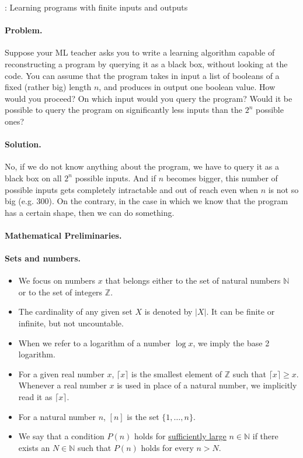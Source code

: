 \documentclass{article}
\begin{document}
			\begin{example}{: Learning programs with finite inputs and outputs}
				{\small
				\paragraph{\small Problem.}
				Suppose your ML teacher asks you to write a learning algorithm capable of reconstructing a program by querying it as a black box, without looking at the code. You can assume that the program takes in input a list of booleans of a fixed (rather big) length $n$, and produces in output one boolean value. How would you proceed? On which input would you query the program? Would it be possible to query the program on significantly less inputs than the $2^n$ possible ones?\\
				\paragraph{\small Solution.}
				No, if we do not know anything about the program, we have to query it as a black box on all $2^n$ possible inputs. And if $n$ becomes bigger, this number of possible inputs gets completely intractable and out of reach even when $n$ is not so big (e.g. 300). On the contrary, in the case in which we know that the program has a certain shape, then we can do something.
				}
			\end{example}
			\paragraph{\large Mathematical Preliminaries.}
			\paragraph{Sets and numbers.}
			\begin{itemize}
   				\item We focus on numbers $x$ that belongs either to the set of natural numbers $\mathbb{N}$ or to the set of integers $\mathbb{Z}$.
    			\item The cardinality of any given set $X$ is denoted by $\left\lvert X\right\rvert$. It can be finite or infinite, but not uncountable.
    			\item When we refer to a logarithm of a number $\log x$, we imply the base 2 logarithm.
    			\item For a given real number $x$, $\lceil x \rceil$ is the smallest element of $\mathbb{Z}$ such that $\lceil x \rceil \geq x$. Whenever a real number $x$ is used in place of a natural number, we implicitly read it as $\lceil x \rceil$.
    			\item For a natural number $n$, $[n]$ is the set $\{1,\dots,n\}$.
    			\item We say that a condition $P(n)$ holds for \uline{sufficiently large} $n\in \mathbb{N}$ if there exists an $N\in \mathbb{N}$ such that $P(n)$ holds for every $n>N$.
			\end{itemize}
\end{document}
